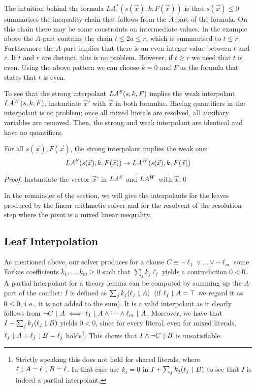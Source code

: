 The intuition behind the formula $LA^*(s(\vec x), k, F(\vec x))$ is that
$s(\vec x) \leq 0$ summarises the inequality chain that follows from the $A$-part of
the formula.  On this chain there may be some constraints on
intermediate values.  In the example above the $A$-part contains the
chain $t \leq 2a \leq r$, which is summarised to $t\leq r$.
Furthermore the $A$-part implies that there is an even integer value between
$t$ and $r$.  If $t$ and $r$ are distinct, this is no problem.
However, if $t \geq r$ we need that $t$ is even. Using the above
pattern we can choose $k=0$ and $F$ as the formula that states that
$t$ is even.  

To see that the strong interpolant $LA\S(s,k,F)$ implies the weak
interpolant $LA\W(s,k,F)$, instantiate $\vec x'$ with $\vec x$ in both 
formulae.
Having quantifiers in
the interpolant is no problem; once all mixed literals are resolved,
all auxiliary variables
are removed.  Then, the strong and weak interpolant are identical and have
no quantifiers.

\begin{techreport}
\begin{lemma} \label{lemma_las_implies_law}
  For all $s(\vec x),F(\vec x)$, the strong interpolant implies the weak one:
\[  LA\S(s(\vec x),k,F(\vec x)) \rightarrow LA\W(s(\vec x),k,F(\vec x))\]
\end{lemma}
\begin{proof}
  Instantiate the vector $\vec x'$ in $LA\S$ and $LA\W$ with $\vec x$.\qed
\end{proof}
\end{techreport}
\fi

In the remainder of the section, we will give the interpolants for the
leaves produced by the linear arithmetic solver and for the resolvent of the
resolution step where the pivot is a mixed linear inequality.

\subsection{Leaf Interpolation}

As mentioned above, our solver produces for a clause $C\equiv\lnot
\ell_1\lor \dots \lor\lnot \ell_m$ some Farkas coefficients
$k_1,\dots,k_m\geq 0$ such that $\sum_j k_j \ell_j$ yields a
contradiction $0 < 0$.  A partial interpolant for a theory lemma can be
computed by summing up the $A$-part of the conflict: $I$ is defined as
$\sum_j k_j (\ell_j \proj A)$~(if $\ell_j\proj A = \top$ we regard it
as $0\leq 0$, i.\,e., it is not added to the sum).  It is a valid interpolant as it
clearly follows from $\lnot C\proj A \iff \ell_1\proj A \land \dots
\land \ell_m\proj A$.  Moreover, we have that $I + \sum_j
k_j(\ell_j\proj B)$ yields $0< 0$, since for every literal, even
for mixed literals, $\ell_j\proj A + \ell_j\proj B = \ell_j$
holds\footnote{Strictly speaking this does not hold for shared literals, where
  $\ell\proj A = \ell\proj B = \ell$.  In that case use $k_j=0$ in
$I+\sum_j k_j(\ell_j\proj B)$ to see that $I$ is indeed a partial interpolant.}.  This
shows that $I\land \lnot C\proj B$ is unsatisfiable.

